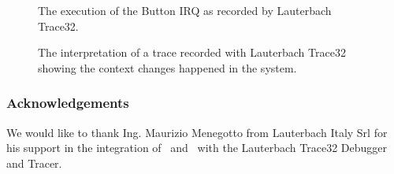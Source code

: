 %
\begin{figure}
\caption{\label{fig:trace32_chart_irq} The execution of the Button IRQ
as recorded by Lauterbach Trace32.}
\end{figure}

%
\begin{figure}
\caption{\label{fig:trace32_chart_state} The interpretation of a trace
recorded with Lauterbach Trace32 showing the context changes happened
in the system.}
\end{figure}

\subsubsection{Acknowledgements}

We would like to thank Ing. Maurizio Menegotto from Lauterbach Italy
Srl for his support in the integration of \rtd\ and \ee\ with the
Lauterbach Trace32 Debugger and Tracer.

